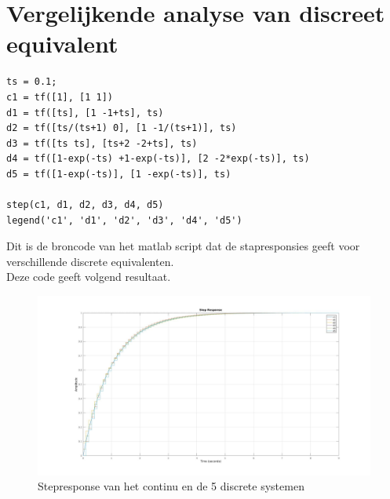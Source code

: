 \documentclass[a4paper, 12pt]{article}
\begin{document}
\section{Vergelijkende analyse van discreet equivalent}

\begin{lstlisting}
ts = 0.1;
c1 = tf([1], [1 1])
d1 = tf([ts], [1 -1+ts], ts)
d2 = tf([ts/(ts+1) 0], [1 -1/(ts+1)], ts)
d3 = tf([ts ts], [ts+2 -2+ts], ts)
d4 = tf([1-exp(-ts) +1-exp(-ts)], [2 -2*exp(-ts)], ts)
d5 = tf([1-exp(-ts)], [1 -exp(-ts)], ts)

step(c1, d1, d2, d3, d4, d5)
legend('c1', 'd1', 'd2', 'd3', 'd4', 'd5')
\end{lstlisting}

Dit is de broncode van het matlab script dat de stapresponsies geeft voor verschillende discrete equivalenten.\\
Deze code geeft volgend resultaat.

\begin{figure}[!h]
	\includegraphics[width=1\linewidth]{Labo3_step_response.jpg}
	\caption{Stepresponse van het continu en de 5 discrete systemen}
	\label{fig:Labo3_step_response}
\end{figure}
\end{document}
